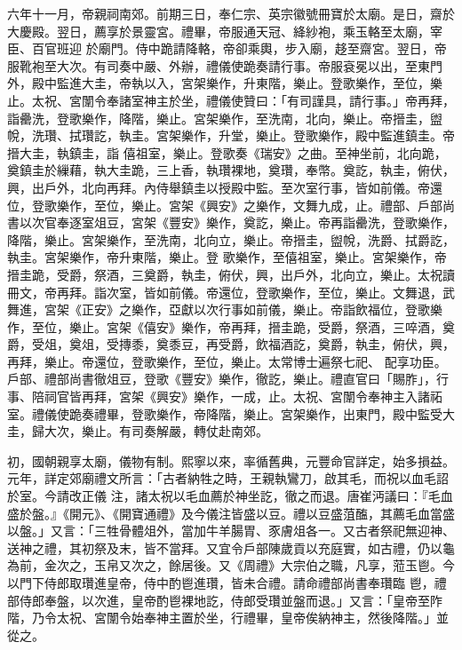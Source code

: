 \begin{pinyinscope}
 六年十一月，帝親祠南郊。前期三日，奉仁宗、英宗徽號冊寶於太廟。是日，齋於大慶殿。翌日，薦享於景靈宮。禮畢，帝服通天冠、絳紗袍，乘玉輅至太廟，宰臣、百官班迎
 於廟門。侍中跪請降輅，帝卻乘輿，步入廟，趍至齋宮。翌日，帝服靴袍至大次。有司奏中嚴、外辦，禮儀使跪奏請行事。帝服袞冕以出，至東門外，殿中監進大圭，帝執以入，宮架樂作，升東階，樂止。登歌樂作，至位，樂止。太祝、宮闈令奉諸室神主於坐，禮儀使贊曰：「有司謹具，請行事。」帝再拜，詣罍洗，登歌樂作，降階，樂止。宮架樂作，至洗南，北向，樂止。帝搢圭，盥帨，洗瓚、拭瓚訖，執圭。宮架樂作，升堂，樂止。登歌樂作，殿中監進鎮圭。帝搢大圭，執鎮圭，詣
 僖祖室，樂止。登歌奏《瑞安》之曲。至神坐前，北向跪，奠鎮圭於繅藉，執大圭跪，三上香，執瓚裸地，奠瓚，奉幣。奠訖，執圭，俯伏，興，出戶外，北向再拜。內侍舉鎮圭以授殿中監。至次室行事，皆如前儀。帝還位，登歌樂作，至位，樂止。宮架《興安》之樂作，文舞九成，止。禮部、戶部尚書以次官奉逐室俎豆，宮架《豐安》樂作，奠訖，樂止。帝再詣罍洗，登歌樂作，降階，樂止。宮架樂作，至洗南，北向立，樂止。帝搢圭，盥帨，洗爵、拭爵訖，執圭。宮架樂作，帝升東階，樂止。登
 歌樂作，至僖祖室，樂止。宮架樂作，帝搢圭跪，受爵，祭酒，三奠爵，執圭，俯伏，興，出戶外，北向立，樂止。太祝讀冊文，帝再拜。詣次室，皆如前儀。帝還位，登歌樂作，至位，樂止。文舞退，武舞進，宮架《正安》之樂作，亞獻以次行事如前儀，樂止。帝詣飲福位，登歌樂作，至位，樂止。宮架《僖安》樂作，帝再拜，搢圭跪，受爵，祭酒，三啐酒，奠爵，受俎，奠俎，受摶黍，奠黍豆，再受爵，飲福酒訖，奠爵，執圭，俯伏，興，再拜，樂止。帝還位，登歌樂作，至位，樂止。太常博士遍祭七祀、
 配享功臣。戶部、禮部尚書徹俎豆，登歌《豐安》樂作，徹訖，樂止。禮直官曰「賜胙」，行事、陪祠官皆再拜，宮架《興安》樂作，一成，止。太祝、宮闈令奉神主入諸祏室。禮儀使跪奏禮畢，登歌樂作，帝降階，樂止。宮架樂作，出東門，殿中監受大圭，歸大次，樂止。有司奏解嚴，轉仗赴南郊。



 初，國朝親享太廟，儀物有制。熙寧以來，率循舊典，元豐命官詳定，始多損益。元年，詳定郊廟禮文所言：「古者納牲之時，王親執鸞刀，啟其毛，而祝以血毛詔於室。今請改正儀
 注，諸太祝以毛血薦於神坐訖，徹之而退。唐崔沔議曰：『毛血盛於盤。』《開元》、《開寶通禮》及今儀注皆盛以豆。禮以豆盛菹醢，其薦毛血當盛以盤。」又言：「三牲骨體俎外，當加牛羊腸胃、豕膚俎各一。又古者祭祀無迎神、送神之禮，其初祭及末，皆不當拜。又宜令戶部陳歲貢以充庭實，如古禮，仍以龜為前，金次之，玉帛又次之，餘居後。又《周禮》大宗伯之職，凡享，蒞玉鬯。今以門下侍郎取瓚進皇帝，侍中酌鬯進瓚，皆未合禮。請命禮部尚書奉瓚臨
 鬯，禮部侍郎奉盤，以次進，皇帝酌鬯裸地訖，侍郎受瓚並盤而退。」又言：「皇帝至阼階，乃令太祝、宮闈令始奉神主置於坐，行禮畢，皇帝俟納神主，然後降階。」並從之。




\end{pinyinscope}

